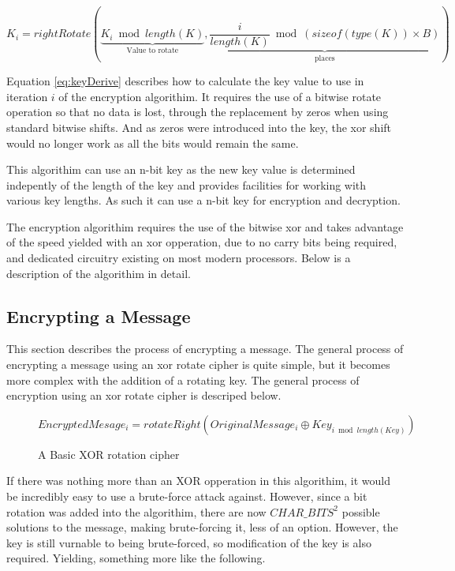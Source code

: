 \documentclass[12pt]{article}
\begin{document}
  \begin{equation}
    \label{eq:keyDerive}
    K_i = rightRotate(
        \underbrace{K_i \bmod length(K)}_\text{Value to rotate},
        \underbrace{\frac{i}{length(K)} \bmod (sizeof(type(K)) 
            \times B)}_\text{places}) 
  \end{equation}

  Equation \eqref{eq:keyDerive} describes how to calculate the key value to use
  in iteration \( i \) of the encryption algorithim. It requires the use
  of a bitwise rotate operation so that no data is lost, through the
  replacement by zeros when using standard bitwise shifts. And as zeros
  were introduced into the key, the xor shift would no longer work as
  all the bits would remain the same.

  This algorithim can use an n-bit key as the new key value is
  determined indepently of the length of the key and provides
  facilities for working with various key lengths. As such it can use
  a n-bit key for encryption and decryption.

  The encryption algorithim requires the use of the bitwise xor and
  takes advantage of the speed yielded with an xor opperation, due to
  no carry bits being required, and dedicated circuitry existing on most
  modern processors. Below is a description of the algorithim in detail.

  \subsection{Encrypting a Message}
    This section describes the process of encrypting a message.
    The general process of encrypting a message using an xor rotate
    cipher is quite simple, but it becomes more complex with the
    addition of a rotating key. The general process of encryption
    using an xor rotate cipher is descriped below. 
    
    \begin{figure}[h]
    \begin{algorithmic}[1]
      \State $EncryptedMesage_i =
             rotateRight(OriginalMessage_i \oplus Key_{i \bmod length(Key)})$
    \EndFor 
    \end{algorithmic}
    \caption{A Basic XOR rotation cipher}
    \end{figure}

    If there was nothing more than an XOR opperation in this algorithim,
    it would be incredibly easy to use a brute-force attack against.
    However, since a bit rotation was added into the algorithim, there
    are now \(CHAR\_BITS^2\) possible solutions to the message, making
    brute-forcing it, less of an option. However, the key is still
    vurnable to being brute-forced, so modification of the key is also
    required. Yielding, something more like the following.
    
\end{document}
